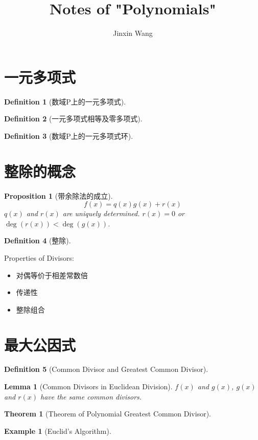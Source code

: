 \documentclass[onecolumn]{ctexart}
\title{Notes of "Polynomials"}
\author{Jinxin Wang}
\date{}
\newtheorem{definition}{Definition}
\newtheorem{theorem}{Theorem}
\newtheorem{proposition}{Proposition}
\newtheorem{lemma}{Lemma}
\newtheorem{example}{Example}
\begin{document}
\maketitle

\section{一元多项式}

\begin{definition}[数域P上的一元多项式]
  
\end{definition}

\begin{definition}[一元多项式相等及零多项式]
  
\end{definition}

\begin{definition}[数域P上的一元多项式环]
  
\end{definition}

\section{整除的概念}

\begin{proposition}[带余除法的成立]
  \begin{equation}
    f(x) = q(x)g(x) + r(x)
  \end{equation}
  $q(x)$ and $r(x)$ are uniquely determined. $r(x ) = 0$ or $\deg(r(x)) < \deg(g(x))$.
\end{proposition}

\begin{definition}[整除]
  
\end{definition}

Properties of Divisors:
\begin{itemize}
  \item 对偶等价于相差常数倍
  \item 传递性
  \item 整除组合
\end{itemize}

\section{最大公因式}

\begin{definition}[Common Divisor and Greatest Common Divisor]
  
\end{definition}

\begin{lemma}[Common Divisors in Euclidean Division]
  $f(x)$ and $g(x)$, $g(x)$ and $r(x)$ have the same common divisors.
\end{lemma}

\begin{theorem}[Theorem of Polynomial Greatest Common Divisor]
  
\end{theorem}

\begin{example}[Euclid's Algorithm]
  
\end{example}
\end{document}
